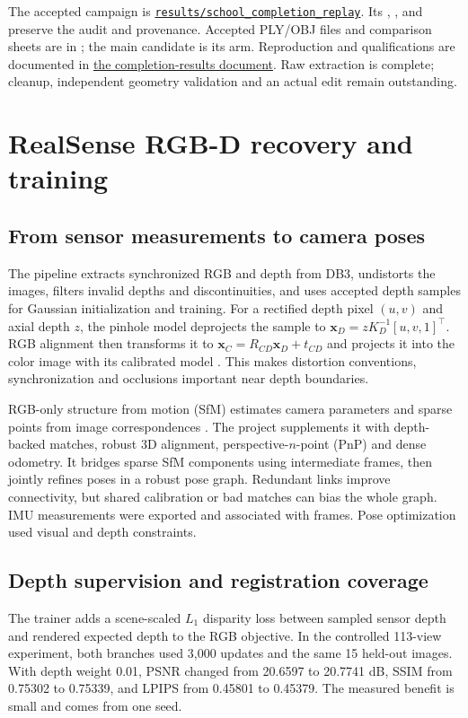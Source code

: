\documentclass[11pt,a4paper]{article}
\begin{document}
The accepted campaign is \href{run:results/school_completion_replay_20261109}{\texttt{results/school\_completion\_replay}}.
Its , ,
 and  preserve the
audit and provenance. Accepted PLY/OBJ files and comparison sheets are in
; the main candidate is its  arm.
Reproduction and qualifications are documented in
\href{run:docs/SCHOOL_COMPLETION_RESULTS_20261109.md}{the completion-results document}. Raw extraction is complete;
cleanup, independent geometry validation and an actual edit remain outstanding.

\clearpage
\section{RealSense RGB-D recovery and training}
\subsection{From sensor measurements to camera poses}
The pipeline extracts synchronized RGB and depth from DB3, undistorts the
images, filters invalid depths and discontinuities, and uses accepted depth
samples for Gaussian initialization and training. For a rectified depth
pixel $(u,v)$ and axial depth $z$, the pinhole model deprojects the sample
to $\mathbf{x}_D=zK_D^{-1}[u,v,1]^\top$. RGB alignment then transforms it
to $\mathbf{x}_C=R_{CD}\mathbf{x}_D+t_{CD}$ and projects it into the color
image with its calibrated model \cite{realsense}. This makes distortion
conventions, synchronization and occlusions important near depth boundaries.

RGB-only structure from motion (SfM) estimates camera parameters and sparse
points from image correspondences \cite{colmap}. The project supplements it
with depth-backed matches, robust 3D alignment, perspective-$n$-point (PnP)
and dense odometry. It bridges sparse SfM components using intermediate
frames, then jointly refines poses in a robust pose graph. Redundant links
improve connectivity, but shared calibration or bad matches can bias the
whole graph. IMU measurements were exported and associated with frames.
Pose optimization used visual and depth constraints.

\subsection{Depth supervision and registration coverage}
The trainer adds a scene-scaled $L_1$ disparity loss between sampled sensor
depth and rendered expected depth to the RGB objective. In the controlled
113-view experiment, both branches used 3,000 updates and the same 15
held-out images. With depth weight 0.01, PSNR changed from 20.6597 to
20.7741 dB, SSIM from 0.75302 to 0.75339, and LPIPS from 0.45801 to
0.45379. The measured benefit is small and comes from one seed.
\end{document}
